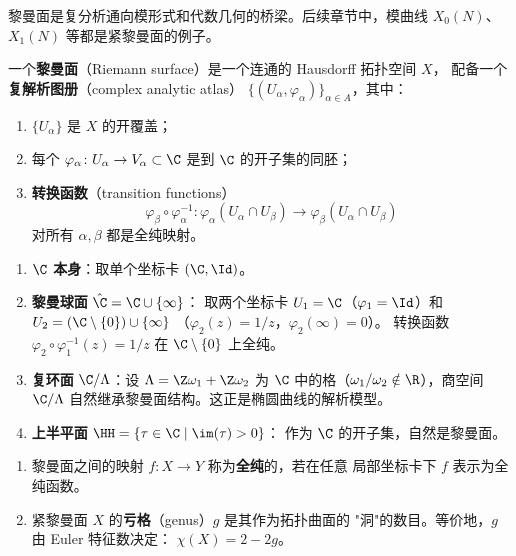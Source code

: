 黎曼面是复分析通向模形式和代数几何的桥梁。后续章节中，模曲线
$X_0(N)$、$X_1(N)$ 等都是紧黎曼面的例子。

\begin{definition}[黎曼面]
\label{def:riemann-surface}
一个\textbf{黎曼面}（Riemann surface）是一个连通的 Hausdorff 拓扑空间 $X$，
配备一个\textbf{复解析图册}（complex analytic atlas）
$\{(U_\alpha, \varphi_\alpha)\}_{\alpha \in A}$，其中：
\begin{enumerate}
  \item $\{U_\alpha\}$ 是 $X$ 的开覆盖；
  \item 每个 $\varphi_\alpha\colon U_\alpha \to V_\alpha \subset \C$
    是到 $\C$ 的开子集的同胚；
  \item \textbf{转换函数}（transition functions）
    \[
      \varphi_\beta \circ \varphi_\alpha^{-1}\colon
      \varphi_\alpha(U_\alpha \cap U_\beta) \to
      \varphi_\beta(U_\alpha \cap U_\beta)
    \]
    对所有 $\alpha, \beta$ 都是全纯映射。
\end{enumerate}
\end{definition}

\begin{example}[黎曼面的基本例子]
\label{ex:riemann-surface-examples}
\leavevmode
\begin{enumerate}
  \item \textbf{$\C$ 本身}：取单个坐标卡 $(\C, \Id)$。
  \item \textbf{黎曼球面} $\hat{\C} = \C \cup \{\infty\}$：
    取两个坐标卡 $U_1 = \C$（$\varphi_1 = \Id$）和
    $U_2 = (\C \setminus \{0\}) \cup \{\infty\}$
    （$\varphi_2(z) = 1/z$，$\varphi_2(\infty) = 0$）。
    转换函数 $\varphi_2 \circ \varphi_1^{-1}(z) = 1/z$ 在
    $\C \setminus \{0\}$ 上全纯。
  \item \textbf{复环面} $\C / \Lambda$：设 $\Lambda = \Z\omega_1 + \Z\omega_2$
    为 $\C$ 中的格（$\omega_1/\omega_2 \notin \R$），商空间
    $\C / \Lambda$ 自然继承黎曼面结构。这正是椭圆曲线的解析模型。
  \item \textbf{上半平面} $\HH = \{\tau \in \C \mid \im(\tau) > 0\}$：
    作为 $\C$ 的开子集，自然是黎曼面。
\end{enumerate}
\end{example}

\begin{definition}[全纯映射与亏格]
\label{def:genus}
\leavevmode
\begin{enumerate}
  \item 黎曼面之间的映射 $f\colon X \to Y$ 称为\textbf{全纯}的，若在任意
    局部坐标卡下 $f$ 表示为全纯函数。
  \item 紧黎曼面 $X$ 的\textbf{亏格}（genus）$g$ 是其作为拓扑曲面的
    "洞"的数目。等价地，$g$ 由 Euler 特征数决定：
    $\chi(X) = 2 - 2g$。
\end{enumerate}
\end{definition}

